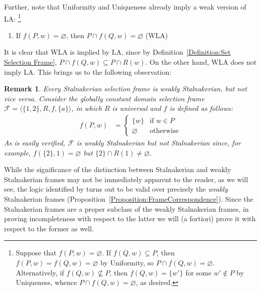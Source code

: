 \documentclass[12pt]{article}
\newtheorem{remark}{Remark}
\newcommand{\tup}[1]{\langle #1 \rangle}
\begin{document}
Further, note that Uniformity and Uniqueness already imply a weak version of LA:%
\footnote{
    Suppose that $f(P,w) = \varnothing$. 
    If $f(Q,w)\subseteq P$, then $f(P,w)=f(Q,w)=\varnothing$ by Uniformity, so $P\cap f(Q,w)=\varnothing$. 
    Alternatively, if $f(Q,w) \nsubseteq P$, then $f(Q,w)=\{w'\}$ for some $w'\not\in P$ by Uniqueness, whence $P \cap f(Q,w)=\varnothing$, as desired.
    } %
    \begin{enumerate}
        \item[3$^-$.] If $f(P,w) = \varnothing$, then $P \cap f(Q,w) = \varnothing$ \hfill (WLA)
    \end{enumerate}
It is clear that WLA is implied by LA, since by Definition~\ref{Definition:Set Selection Frame}, $P \cap f(Q,w) \subseteq P \cap R(w)$. 
On the other hand, WLA does not imply LA. This brings us to the following observation:

\begin{remark}
\label{Remark:WeakStalnakerian}
    Every Stalnakerian selection frame is weakly Stalnakerian, but not vice versa. 
    Consider the globally constant domain selection frame $\mathcal{F} = \tup{\{1,2\}, R, f, \{a\}}$, in which $R$ is universal and $f$ is defined as follows:
    \begin{align*}
        f(P,w) & = {
        \begin{cases}
            \{w\} & \text{if } w \in P \\
            \varnothing & \text{otherwise}
        \end{cases}
        }
    \end{align*}
    As is easily verified, $\mathcal{F}$ is weakly Stalnakerian but not Stalnakerian since, for example, $f(\{2\},1)=\varnothing$ but $\{2\}\cap R(1)\neq\varnothing$.
\end{remark}

While the significance of the distinction between Stalnakerian and weakly Stalnakerian frames may not be immediately apparent to the reader, as we will see, the logic identified by \cite{StalnakerThomason1970} turns out to be valid over precisely the \textit{weakly} Stalnakerian frames (Proposition~\ref{Proposition:FrameCorrespondence}).
Since the Stalnakerian frames are a proper subclass of the weakly Stalnakerian frames, in proving incompleteness with respect to the latter we will (a fortiori) prove it with respect to the former as well.

\end{document}
